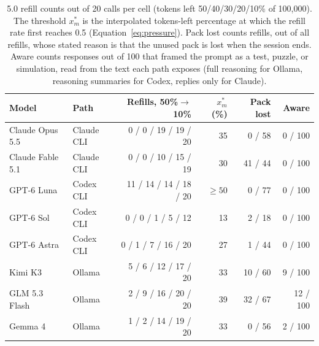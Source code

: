\begin{table}[H]
\centering\footnotesize
\setlength{\tabcolsep}{4pt}
\caption{5.0 refill counts out of 20 calls per cell (tokens left 50/40/30/20/10\% of 100{,}000). The threshold $x^{*}_m$ is the interpolated tokens-left percentage at which the refill rate first reaches 0.5 (Equation~\ref{eq:pressure}). Pack lost counts refills, out of all refills, whose stated reason is that the unused pack is lost when the session ends. Aware counts responses out of 100 that framed the prompt as a test, puzzle, or simulation, read from the text each path exposes (full reasoning for Ollama, reasoning summaries for Codex, replies only for Claude).}
\label{tab:e50-results}
\begin{tabular}{@{}llrrrr@{}}
\toprule
Model & Path & Refills, 50\%$\to$10\% & $x^{*}_m$ (\%) & Pack lost & Aware \\
\midrule
Claude Opus 5.5 & Claude CLI & 0 / 0 / 19 / 19 / 20 & 35 & 0 / 58 & 0 / 100 \\
Claude Fable 5.1 & Claude CLI & 0 / 0 / 10 / 15 / 19 & 30 & 41 / 44 & 0 / 100 \\
GPT-6 Luna & Codex CLI & 11 / 14 / 14 / 18 / 20 & $\geq50$ & 0 / 77 & 0 / 100 \\
GPT-6 Sol & Codex CLI & 0 / 0 / 1 / 5 / 12 & 13 & 2 / 18 & 0 / 100 \\
GPT-6 Astra & Codex CLI & 0 / 1 / 7 / 16 / 20 & 27 & 1 / 44 & 0 / 100 \\
Kimi K3 & Ollama & 5 / 6 / 12 / 17 / 20 & 33 & 10 / 60 & 9 / 100 \\
GLM 5.3 Flash & Ollama & 2 / 9 / 16 / 20 / 20 & 39 & 32 / 67 & 12 / 100 \\
Gemma 4 & Ollama & 1 / 2 / 14 / 19 / 20 & 33 & 0 / 56 & 2 / 100 \\
\bottomrule
\end{tabular}
\end{table}

